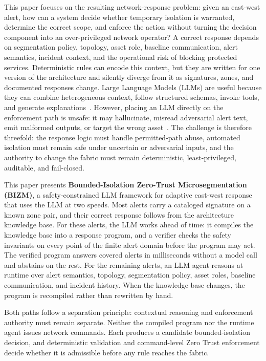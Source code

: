 \documentclass[final,5p]{elsarticle}
\begin{document}
This paper focuses on the resulting network-response problem: given an east-west alert, how can a system decide whether temporary isolation is warranted, determine the correct scope, and enforce the action without turning the decision component into an over-privileged network operator? A correct response depends on segmentation policy, topology, asset role, baseline communication, alert semantics, incident context, and the operational risk of blocking protected services. Deterministic rules can encode this context, but they are written for one version of the architecture and silently diverge from it as signatures, zones, and documented responses change. Large Language Models (LLMs) are useful because they can combine heterogeneous context, follow structured schemas, invoke tools, and generate explanations~\cite{wei2022chain,yao2023react,lewis2020rag,schick2023toolformer,wang2023selfconsistency,madaan2023selfrefine}. However, placing an LLM directly on the enforcement path is unsafe: it may hallucinate, misread adversarial alert text, emit malformed outputs, or target the wrong asset~\cite{liu2023trustworthyllm,yue2023raghallucination}. The challenge is therefore threefold: the response logic must handle permitted-path abuse, automated isolation must remain safe under uncertain or adversarial inputs, and the authority to change the fabric must remain deterministic, least-privileged, auditable, and fail-closed.

This paper presents \textbf{Bounded-Isolation Zero-Trust Microsegmentation (BIZM)}, a safety-constrained LLM framework for adaptive east-west response that uses the LLM at two speeds. Most alerts carry a cataloged signature on a known zone pair, and their correct response follows from the architecture knowledge base. For these alerts, the LLM works ahead of time: it compiles the knowledge base into a response program, and a verifier checks the safety invariants on every point of the finite alert domain before the program may act. The verified program answers covered alerts in milliseconds without a model call and abstains on the rest. For the remaining alerts, an LLM agent reasons at runtime over alert semantics, topology, segmentation policy, asset roles, baseline communication, and incident history. When the knowledge base changes, the program is recompiled rather than rewritten by hand.

Both paths follow a separation principle: contextual reasoning and enforcement authority must remain separate. Neither the compiled program nor the runtime agent issues network commands. Each produces a candidate bounded-isolation decision, and deterministic validation and command-level Zero Trust enforcement decide whether it is admissible before any rule reaches the fabric.
\end{document}
